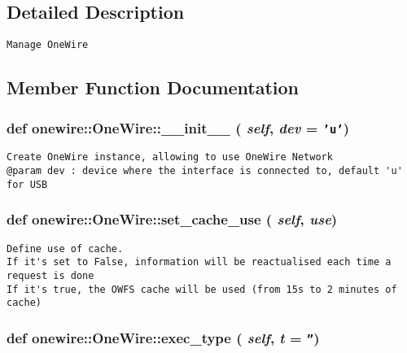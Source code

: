 \subsection{Detailed Description}


\footnotesize\begin{verbatim}
Manage OneWire 
\end{verbatim}
\normalsize
 

\subsection{Member Function Documentation}
\hypertarget{classonewire_1_1OneWire_effc317af881a97edf6d7dd77c63b88c}{
\subsubsection[\_\-\_\-init\_\-\_\-]{\setlength{\rightskip}{0pt plus 5cm}def onewire::OneWire::\_\-\_\-init\_\-\_\- ( {\em self}, \/   {\em dev} = {\tt 'u'})}}
\label{classonewire_1_1OneWire_effc317af881a97edf6d7dd77c63b88c}




\footnotesize\begin{verbatim}
Create OneWire instance, allowing to use OneWire Network
@param dev : device where the interface is connected to, default 'u' for USB
\end{verbatim}
\normalsize
 \hypertarget{classonewire_1_1OneWire_41228b6b8c1562f02d0b40c8e40d96b4}{
\subsubsection[set\_\-cache\_\-use]{\setlength{\rightskip}{0pt plus 5cm}def onewire::OneWire::set\_\-cache\_\-use ( {\em self}, \/   {\em use})}}
\label{classonewire_1_1OneWire_41228b6b8c1562f02d0b40c8e40d96b4}




\footnotesize\begin{verbatim}
Define use of cache.
If it's set to False, information will be reactualised each time a request is done
If it's true, the OWFS cache will be used (from 15s to 2 minutes of cache)
\end{verbatim}
\normalsize
 \hypertarget{classonewire_1_1OneWire_8c52e866328b82976eb9f799f891f487}{
\subsubsection[exec\_\-type]{\setlength{\rightskip}{0pt plus 5cm}def onewire::OneWire::exec\_\-type ( {\em self}, \/   {\em t} = {\tt ''})}}
\label{classonewire_1_1OneWire_8c52e866328b82976eb9f799f891f487}




